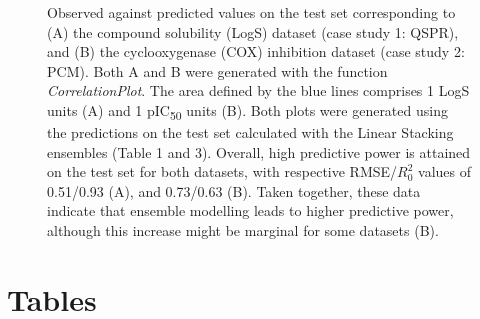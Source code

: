 \documentclass[twoside,a4wide,10pt]{article}
\begin{document}
\begin{figure}[htb!]
\begin{center}
\end{center}
\caption{Observed against predicted values on the test set corresponding to 
(A) the compound solubility (LogS) dataset (case study 1: QSPR),
and (B) the cyclooxygenase (COX) inhibition dataset (case study 2: PCM).
Both A and B were generated with the function {\it CorrelationPlot}.
The area defined by the blue lines comprises 1 LogS units (A) and 1 pIC\textsubscript{50} units (B).
Both plots were generated using the predictions on the test set calculated with the Linear Stacking ensembles (Table 1 and 3).
Overall, high predictive power is attained on the test set for both datasets, 
with respective RMSE/$R_{0}^2$ values of 0.51/0.93 (A), and 0.73/0.63 (B).
Taken together, these data indicate that ensemble modelling leads to higher predictive power, 
although this increase might be marginal for some datasets (B).
}
\label{}
\end{figure}

\clearpage
\section*{Tables}



\end{document}
